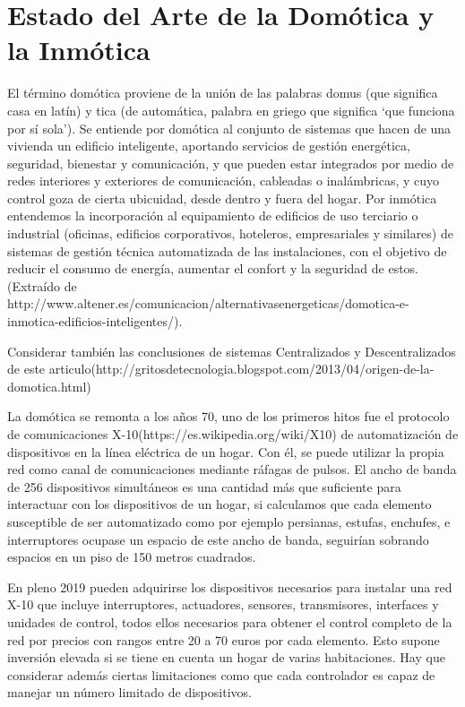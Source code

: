 \section{Estado del Arte de la Domótica y la Inmótica}
\label{makereference1.1.1}

El término domótica proviene de la unión de las palabras domus (que significa casa en latín) y tica (de automática, palabra en griego que significa ‘que funciona por sí sola’). Se entiende por domótica al conjunto de sistemas que hacen de una vivienda un edificio inteligente, aportando servicios de gestión energética, seguridad, bienestar y comunicación, y que pueden estar integrados por medio de redes interiores y exteriores de comunicación, cableadas o inalámbricas, y cuyo control goza de cierta ubicuidad, desde dentro y fuera del hogar.
Por inmótica entendemos la incorporación al equipamiento de edificios de uso terciario o industrial (oficinas, edificios corporativos, hoteleros, empresariales y similares) de sistemas de gestión técnica automatizada de las instalaciones, con el objetivo de reducir el consumo de energía, aumentar el confort y la seguridad de estos.
(Extraído de http://www.altener.es/comunicacion/alternativasenergeticas/domotica-e-inmotica-edificios-inteligentes/).

Considerar también las conclusiones de sistemas Centralizados y Descentralizados de este articulo(http://gritosdetecnologia.blogspot.com/2013/04/origen-de-la-domotica.html)

La domótica se remonta a los años 70, uno de los primeros hitos fue el protocolo de comunicaciones X-10(https://es.wikipedia.org/wiki/X10) de automatización de dispositivos en la línea eléctrica de un hogar. Con él, se puede utilizar la propia red como canal de comunicaciones mediante ráfagas de pulsos. El ancho de banda de 256 dispositivos simultáneos es una cantidad más que suficiente para interactuar con los dispositivos de un hogar, si calculamos que cada elemento susceptible de ser automatizado como por ejemplo persianas, estufas, enchufes, e interruptores ocupase un espacio de este ancho de banda, seguirían sobrando espacios en un piso de 150 metros cuadrados.

En pleno 2019 pueden adquirirse los dispositivos necesarios para instalar una red X-10 que incluye interruptores, actuadores, sensores, transmisores, interfaces y unidades de control, todos ellos necesarios para obtener el control completo de la red por precios con rangos entre 20 a 70 euros por cada elemento. Esto supone inversión elevada si se tiene en cuenta un hogar de varias habitaciones.  Hay que considerar además ciertas limitaciones como que cada controlador es capaz de manejar un número limitado de dispositivos.

